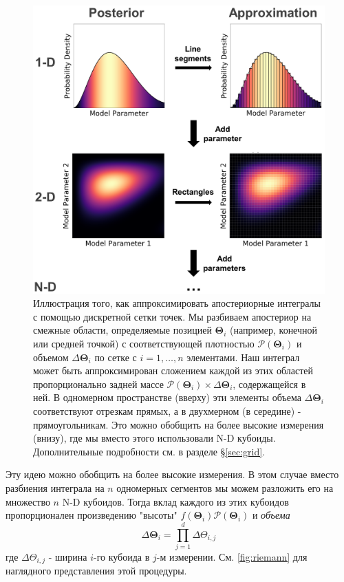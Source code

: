 \documentclass[12pt, titlepage]{article}
\newcommand{\params}{\ensuremath{\boldsymbol\Theta}}
\newcommand{\posterior}{\ensuremath{\mathcal{P}}}
\begin{document}
\begin{figure}
\begin{center}
\includegraphics[width=\textwidth]{figures/fig3.png}
\end{center}
\caption{Иллюстрация того, как аппроксимировать апостериорные интегралы с помощью дискретной сетки точек. Мы разбиваем апостериор на смежные области, определяемые позицией $\params_i$ (например, конечной или средней точкой) с соответствующей плотностью $\posterior(\params_i)$ и объемом $\Delta \params_i$ по сетке с $i=1,\dots,n$ элементами. Наш интеграл может быть аппроксимирован сложением каждой из этих областей пропорционально задней массе $\posterior(\params_i) \times \Delta \params_i$, содержащейся в ней. В одномерном пространстве (вверху) эти элементы объема $\Delta\params_i$ соответствуют отрезкам прямых, а в двухмерном (в середине) - прямоугольникам. Это можно обобщить на более высокие измерения (внизу), где мы вместо этого использовали N-D кубоиды. Дополнительные подробности см. в разделе \S\ref{sec:grid}.
}\label{fig:riemann}
\end{figure}

Эту идею можно обобщить на более высокие измерения. В этом случае вместо разбиения интеграла на $n$ одномерных сегментов мы можем разложить его на множество $n$ N-D кубоидов. Тогда вклад каждого из этих кубоидов пропорционален произведению "высоты" $f(\params_i)\posterior(\params_i)$ и \textit{объема}
\begin{equation}
    \Delta \params_i = \prod_{j=1}^{d} \Delta \Theta_{i,j}
\end{equation}
где $\Delta \Theta_{i,j}$ - ширина $i$-го кубоида в $j$-м измерении. См. {\color{red} \autoref{fig:riemann}} для наглядного представления этой процедуры.
\end{document}
